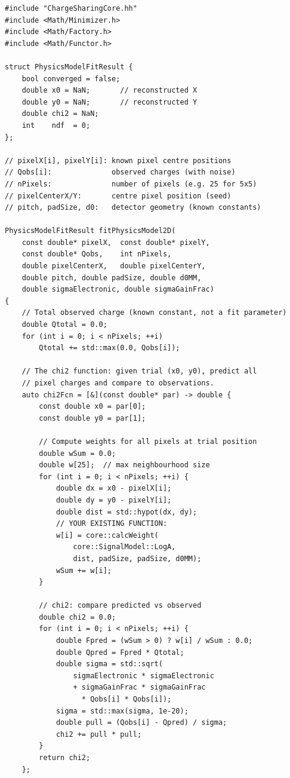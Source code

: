 \documentclass[11pt,a4paper]{article}
\begin{document}
\begin{lstlisting}
#include "ChargeSharingCore.hh"
#include <Math/Minimizer.h>
#include <Math/Factory.h>
#include <Math/Functor.h>

struct PhysicsModelFitResult {
    bool converged = false;
    double x0 = NaN;       // reconstructed X
    double y0 = NaN;       // reconstructed Y
    double chi2 = NaN;
    int    ndf  = 0;
};

// pixelX[i], pixelY[i]: known pixel centre positions
// Qobs[i]:              observed charges (with noise)
// nPixels:              number of pixels (e.g. 25 for 5x5)
// pixelCenterX/Y:       centre pixel position (seed)
// pitch, padSize, d0:   detector geometry (known constants)

PhysicsModelFitResult fitPhysicsModel2D(
    const double* pixelX,  const double* pixelY,
    const double* Qobs,    int nPixels,
    double pixelCenterX,   double pixelCenterY,
    double pitch, double padSize, double d0MM,
    double sigmaElectronic, double sigmaGainFrac)
{
    // Total observed charge (known constant, not a fit parameter)
    double Qtotal = 0.0;
    for (int i = 0; i < nPixels; ++i)
        Qtotal += std::max(0.0, Qobs[i]);

    // The chi2 function: given trial (x0, y0), predict all
    // pixel charges and compare to observations.
    auto chi2Fcn = [&](const double* par) -> double {
        const double x0 = par[0];
        const double y0 = par[1];

        // Compute weights for all pixels at trial position
        double wSum = 0.0;
        double w[25];  // max neighbourhood size
        for (int i = 0; i < nPixels; ++i) {
            double dx = x0 - pixelX[i];
            double dy = y0 - pixelY[i];
            double dist = std::hypot(dx, dy);
            // YOUR EXISTING FUNCTION:
            w[i] = core::calcWeight(
                core::SignalModel::LogA,
                dist, padSize, padSize, d0MM);
            wSum += w[i];
        }

        // chi2: compare predicted vs observed
        double chi2 = 0.0;
        for (int i = 0; i < nPixels; ++i) {
            double Fpred = (wSum > 0) ? w[i] / wSum : 0.0;
            double Qpred = Fpred * Qtotal;
            double sigma = std::sqrt(
                sigmaElectronic * sigmaElectronic
                + sigmaGainFrac * sigmaGainFrac
                  * Qobs[i] * Qobs[i]);
            sigma = std::max(sigma, 1e-20);
            double pull = (Qobs[i] - Qpred) / sigma;
            chi2 += pull * pull;
        }
        return chi2;
    };


\end{lstlisting}
\end{document}
